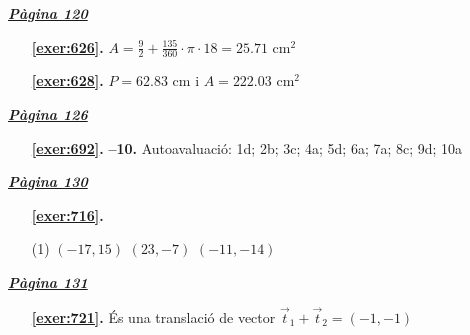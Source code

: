 \hyperlink{page.120}{\textbf{\em Pàgina 120}}
\begin{enumerate}
\item[\fontfamily{phv}\selectfont\color{blue}\textbf{\ref{exer:626}. }] \label{ans:626} 
$A=\frac {9}{2}+ \frac {135}{360} \cdot \pi \cdot 18 = 25.71$ cm$^2$
 \end{enumerate}
\begin{enumerate}
\item[\fontfamily{phv}\selectfont\color{blue}\textbf{\ref{exer:628}. }] \label{ans:628} 
$P=62.83$ cm i $A=222.03$ cm$^2$
 \end{enumerate}
\vspace{0.3cm}


\hyperlink{page.126}{\textbf{\em Pàgina 126}}
\begin{enumerate}
\item[\fontfamily{phv}\selectfont\color{blue}\textbf{\ref{exer:692}. }] \label{ans:692} 
\textbf {--10.} Autoavaluació: 1d; 2b; 3c; 4a; 5d; 6a; 7a; 8c; 9d; 10a
 \end{enumerate}

 \vspace{1cm} 
 

\vspace{0.3cm}


\hyperlink{page.130}{\textbf{\em Pàgina 130}}
\begin{enumerate}



 \item[\fontfamily{phv}\selectfont\color{blue}\textbf{\ref{exer:716}. }] \label{ans:716}
 \begin{tasks}[column-sep=1em, item-indent=1.3333em](1)
	 \task $(-17,15)$
	 \task $(23,-7)$
	 \task $(-11,-14)$
\end{tasks}
 \end{enumerate}
\vspace{0.3cm}


\hyperlink{page.131}{\textbf{\em Pàgina 131}}
\begin{enumerate}
\item[\fontfamily{phv}\selectfont\color{blue}\textbf{\ref{exer:721}. }] \label{ans:721} 
És una translació de vector $\vec t_1 + \vec t_2 = (-1,-1)$
 \end{enumerate}
\vspace{0.3cm}

